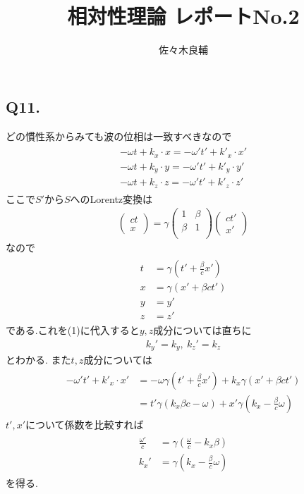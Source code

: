 \documentclass[uplatex,a4j,11pt,dvipdfmx]{jsarticle}
\begin{document}
\title{相対性理論 レポートNo.2}
\author{佐々木良輔}
\date{}
\maketitle
\subsection*{Q11.}
どの慣性系からみても波の位相は一致すべきなので
\begin{align}
  \begin{split}
    -\omega t+k_x\cdot x=-\omega' t'+k'_x\cdot x'\\
    -\omega t+k_y\cdot y=-\omega' t'+k'_y\cdot y'\\
    -\omega t+k_z\cdot z=-\omega' t'+k'_z\cdot z'
  \end{split}
\end{align}
ここで$S'$から$S$へのLorentz変換は
\begin{align*}
  \left(\begin{array}{c}
    ct\\x
  \end{array}\right)
  =\gamma\left(\begin{array}{cc}
    1 & \beta\\
    \beta & 1\\
  \end{array}\right)\left(
    \begin{array}{c}
      ct'\\x'
    \end{array}
  \right)
\end{align*}
なので
\begin{align}
  \begin{split}
    t&=\gamma\left(t'+\frac{\beta}{c}x'\right)\\
    x&=\gamma\left(x'+\beta ct'\right)\\
    y&=y'\\
    z&=z'
  \end{split}
\end{align}
である.これを(1)に代入すると$y,z$成分については直ちに
\begin{align*}
  k_y'=k_y,\ k_z'=k_z
\end{align*}
とわかる.
また$t,z$成分については
\begin{align}
  \begin{split}
    -\omega' t'+k'_x\cdot x'&=-\omega\gamma\left(t'+\frac{\beta}{c}x'\right)+k_x\gamma\left(x'+\beta ct'\right)\\
    &=t'\gamma\left(k_x\beta c-\omega\right)+x'\gamma\left(k_x-\frac{\beta}{c}\omega\right)
  \end{split}
\end{align}
$t',x'$について係数を比較すれば
\begin{align}
  \begin{split}
    \frac{\omega'}{c}&=\gamma\left(\frac{\omega}{c}-k_x\beta\right)\\
    k_x'&=\gamma\left(k_x-\frac{\beta}{c}\omega\right)
  \end{split}
\end{align}
を得る.
\end{document}
